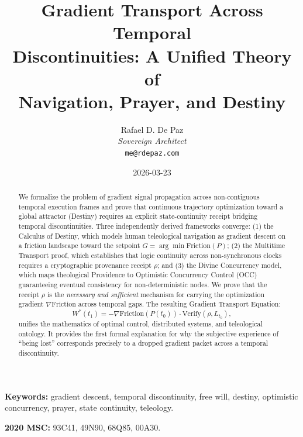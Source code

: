 \documentclass[12pt, a4paper]{article}
\theoremstyle{plain}
\theoremstyle{definition}
\begin{document}
\title{\textbf{
  Gradient Transport Across Temporal \\
  Discontinuities: A Unified Theory of \\
  Navigation, Prayer, and Destiny}}
\author{Rafael D. De Paz \\ \textit{Sovereign Architect} \\ \texttt{me@rdepaz.com}}
\date{2026-03-23}
\maketitle

\begin{abstract}
We formalize the problem of gradient signal propagation across non-contiguous temporal execution frames and prove that continuous trajectory optimization toward a global attractor (Destiny) requires an explicit state-continuity receipt bridging temporal discontinuities. Three independently derived frameworks converge: (1) the Calculus of Destiny, which models human teleological navigation as gradient descent on a friction landscape toward the setpoint $G = \arg\min \text{Friction}(P)$; (2) the Multitime Transport proof, which establishes that logic continuity across non-synchronous clocks requires a cryptographic provenance receipt $\rho$; and (3) the Divine Concurrency model, which maps theological Providence to Optimistic Concurrency Control (OCC) guaranteeing eventual consistency for non-deterministic nodes. We prove that the receipt $\rho$ is the \emph{necessary and sufficient} mechanism for carrying the optimization gradient $\nabla \text{Friction}$ across temporal gaps. The resulting Gradient Transport Equation:
\begin{equation*}
    W^*(t_1) = -\nabla \text{Friction}(P(t_0)) \cdot \text{Verify}(\rho, L_{t_0}),
\end{equation*}
unifies the mathematics of optimal control, distributed systems, and teleological ontology. It provides the first formal explanation for why the subjective experience of ``being lost'' corresponds precisely to a dropped gradient packet across a temporal discontinuity.
\end{abstract}

\vspace{1em}
\noindent\textbf{Keywords:} gradient descent, temporal discontinuity, free will, destiny, optimistic concurrency, prayer, state continuity, teleology.

\vspace{0.5em}
\noindent\textbf{2020 MSC:} 93C41, 49N90, 68Q85, 00A30.
\end{document}
